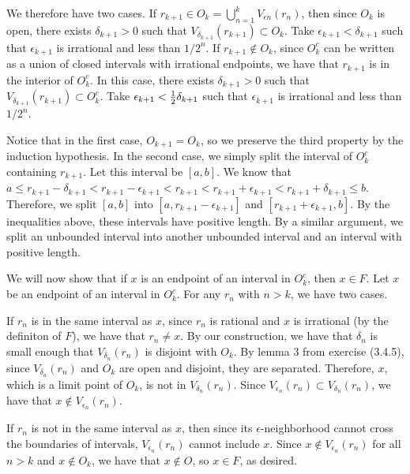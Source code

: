 We therefore have two cases.
If $r_{k+1} \in O_k = \bigcup _{n=1} ^k V _{\epsilon n} (r_n)$,
then since $O_k$ is open, there exists $\delta _{k+1} > 0$
such that $V _{\delta _{k+1}} (r_{k+1}) \subset O_k$.
Take $\epsilon _{k+1} < \delta _{k+1}$
such that $\epsilon _{k+1}$ is irrational and less than $1 / 2^n$.
If $r_{k+1} \notin O_k$, since $O_k^c$ can be written as a union of closed
intervals with irrational endpoints, we have that $r_{k+1}$
is in the interior of $O_k^c$.
In this case, there exists $\delta _{k+1} > 0$
such that $V _{\delta _{k+1}} (r_{k+1}) \subset O_k^c$.
Take $\epsilon _{k+1} < {1 \over 2} \delta _{k+1}$
such that $\epsilon _{k+1}$ is irrational and less than $1 / 2^n$.

Notice that in the first case, $O_{k+1} = O_k$,
so we preserve the third property by the induction hypothesis.
In the second case, we simply split the interval of $O_k^c$
containing $r_{k+1}$.
Let this interval be $[a,b]$.
We know that $a \le r_{k+1} - \delta _{k+1} < r_{k+1} - \epsilon _{k+1} <
r_{k+1} < r_{k+1} + \epsilon _{k+1} < r_{k+1} + \delta _{k+1} \le b$.
Therefore, we split $[a,b]$ into $[a, r_{k+1} - \epsilon _{k+1}]$ and
$[r_{k+1} + \epsilon _{k+1}, b]$.
By the inequalities above, these intervals have positive length.
By a similar argument, we split an unbounded interval into another
unbounded interval and an interval with positive length.

We will now show that
if $x$ is an endpoint of an interval in $O_k^c$, then $x \in F$.
Let $x$ be an endpoint of an interval in $O_k^c$.
For any $r_n$ with $n > k$, we have two cases.

If $r_n$ is in the same interval as $x$,
since $r_n$ is rational and $x$ is irrational (by the definiton of $F$),
we have that $r_n \ne x$.
By our construction, we have that $\delta _n$ is small enough that
$V _{\delta _n} (r_n)$ is disjoint with $O_k$.
By lemma 3 from exercise (3.4.5),
since $V _{\delta _n} (r_n)$ and $O_k$ are open and disjoint,
they are separated.
Therefore, $x$, which is a limit point of $O_k$,
is not in $V _{\delta _n} (r_n)$.
Since $V _{\epsilon _n} (r_n) \subset V _{\delta _n} (r_n)$,
we have that $x \notin V _{\epsilon _n} (r_n)$.

If $r_n$ is not in the same interval as $x$,
then since its $\epsilon$-neighborhood cannot cross the boundaries
of intervals, $V _{\epsilon _n} (r_n)$ cannot include $x$.
Since $x \notin V _{\epsilon _n} (r_n)$ for all $n > k$
and $x \notin O_k$, we have that $x \notin O$, so $x \in F$, as desired.

